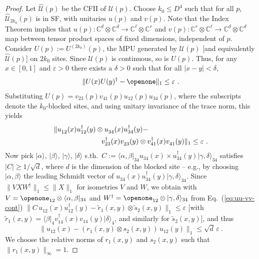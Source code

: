 \documentclass[pra,twocolumn,nofootinbib,superscriptaddress]{revtex4-1}
\newcommand{\ket}[1]{\vert#1\rangle}
\newcommand{\bra}[1]{\langle#1\vert}
\begin{document}
\begin{proof}
	Let $\hat{\mathcal U}(p)$ be the CFII of $\mathcal U(p)$. Choose $k_0\le
		D^4$ such that for all $p$, $\hat{\mathcal U}_{2k_0}(p)$ is in SF, with
	unitaries $u(p)$ and $v(p)$. Note that the Index Theorem implies that
	$u(p):\mathbb C^d\otimes \mathbb C^d\to \mathbb C^\ell\otimes \mathbb C^r$
	and
	$v(p):\mathbb C^r\otimes \mathbb C^\ell\to \mathbb C^d\otimes \mathbb C^d$
	map between tensor product spaces of fixed dimensions,
	independent of $p$. Consider $U(p):=U^{(2k_0)}(p)$, the
	MPU generated by $\mathcal U(p)$ [and equivalently $\hat{\mathcal U}(p)$]
	on $2k_0$ sites. Since $\mathcal U(p)$ is continuous, so is $U(p)$. Thus,
	for any $x\in[0,1]$ and $\varepsilon>0$ there exists a $\delta>0$ such that for all
	$|x-y|<\delta$,
	\[
		\|U(x)U(y)^\dagger - \openone\|_1\le \varepsilon\ .
	\]
	Substituting $U(p)=v_{23}(p)v_{41}(p)u_{12}(p)u_{34}(p)$, where the
	subscripts denote the $k_0$-blocked sites, and using unitary invariance of
	the trace norm, this yields
	\begin{equation}
		\label{eq:uu-vv-cont}
		\begin{aligned}
			\|u_{12}^{\phantom\dagger}(x)u_{12}^\dagger(y)\otimes
			u_{34}^{\phantom\dagger}(x)u_{34}^\dagger(y) -\hspace*{3cm} \\
			v_{23}^{\dagger}(x)v_{23}^{\phantom\dagger}(y)\otimes
			v_{41}^{\dagger}(x)v_{41}^{\phantom\dagger}(y)\|_1
			\le \varepsilon\ .
		\end{aligned}
	\end{equation}
	Now pick $\ket{\alpha}$, $\ket{\beta}$, $\ket{\gamma}$, $\ket{\delta}$
	s.th.\
	$C:=\bra{\alpha,\beta}_{34}
		u_{34}^{\phantom\dagger}(x)\times u_{34}^\dagger(y)\ket{\gamma,\delta}_{34}$
	satisfies $|C|\ge 1/\sqrt{d}$, where $d$ is the dimension of the blocked
	site -- e.g., by choosing  $\ket{\alpha,\beta}$ the leading Schmidt vector of
	$u_{34}^{\phantom\dagger}(x)u_{34}^\dagger(y)\ket{\gamma,\delta}_{34}$.
	Since $\|VXW^\dagger\|_1\le \|X\|_1$ for isometries $V$ and $W$, we obtain
	with $V=\openone_{12}\otimes \bra{\alpha,\beta}_{34}$ and
	$W^\dagger=\openone_{12}\otimes\ket{\gamma,\delta}_{34}$ from
	Eq.~(\ref{eq:uu-vv-cont}) $\|C\,
		u_{12}^{\phantom\dagger}(x)u_{12}^\dagger(y) -\tilde r_{1}(x,y)\otimes
		\tilde s_{2}(x,y)\|_1\le\varepsilon$ [with $\tilde r_1(x,y)=\bra\beta_4
				v_{14}^\dagger(x)v_{14}(y)\ket{\delta}_4$, and similarly for $\tilde s_2(x,y)$],
	and thus
	\[
		\|u_{12}(x) -
		(r_{1}(x,y)\otimes s_{2}(x,y))\, u_{12}(y) \|_1\le
		\sqrt{d}\, \varepsilon\ .
	\]
	We choose the relative norms of $r_1(x,y)$ and $s_2(x,y)$ such
	that $\|r_1(x,y)\|_\infty=1$.


\end{proof}
\end{document}
